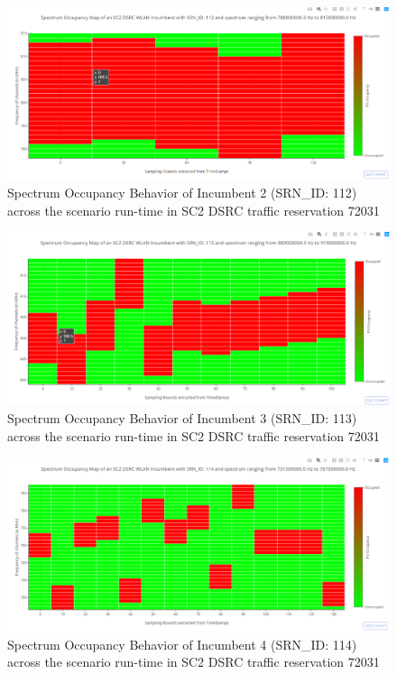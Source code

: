 \documentclass[12pt, draftcls, onecolumn]{IEEEtran}
\begin{document}
\begin{figure}[t]
\includegraphics[width=1.0\textwidth]{Spectrum_Occupancy_DARPA_SC2_Incumbent_WLAN_DSRC_SRN_112.png}
\caption{Spectrum Occupancy Behavior of Incumbent 2 (SRN\_ID: 112) across the scenario run-time in SC2 DSRC traffic reservation 72031}
\label{fig:mesh13}
\centering
\end{figure}
\begin{figure}[t]
\includegraphics[width=1.0\textwidth]{Spectrum_Occupancy_DARPA_SC2_Incumbent_WLAN_DSRC_SRN_113.png}
\caption{Spectrum Occupancy Behavior of Incumbent 3 (SRN\_ID: 113) across the scenario run-time in SC2 DSRC traffic reservation 72031}
\label{fig:mesh14}
\centering
\end{figure}
\begin{figure}[t]
\includegraphics[width=1.0\textwidth]{Spectrum_Occupancy_DARPA_SC2_Incumbent_WLAN_DSRC_SRN_114.png}
\caption{Spectrum Occupancy Behavior of Incumbent 4 (SRN\_ID: 114) across the scenario run-time in SC2 DSRC traffic reservation 72031}
\label{fig:mesh15}
\centering
\end{figure}
\clearpage
\end{document}
